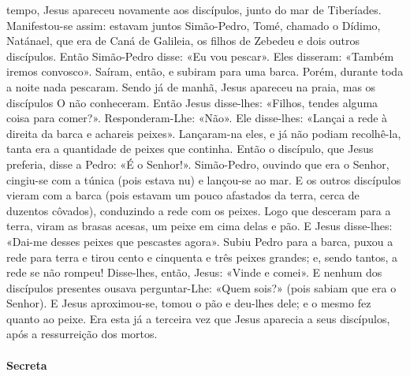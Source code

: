 \begin{paracol}{2}
{ tempo, Jesus apareceu novamente aos discípulos, junto do mar de Tiberíades. Manifestou-se assim: estavam juntos Simão-Pedro, Tomé, chamado o Dídimo, Natánael, que era de Caná de Galileia, os filhos de Zebedeu e dois outros discípulos. Então Simão-Pedro disse: «Eu vou pescar». Eles disseram: «Também iremos convosco». Saíram, então, e subiram para uma barca. Porém, durante toda a noite nada pescaram. Sendo já de manhã, Jesus apareceu na praia, mas os discípulos O não conheceram. Então Jesus disse-lhes: «Filhos, tendes alguma coisa para comer?». Responderam-Lhe: «Não». Ele disse-lhes: «Lançai a rede à direita da barca e achareis peixes». Lançaram-na eles, e já não podiam recolhê-la, tanta era a quantidade de peixes que continha. Então o discípulo, que Jesus preferia, disse a Pedro: «É o Senhor!». Simão-Pedro, ouvindo que era o Senhor, cingiu-se com a túnica (pois estava nu) e lançou-se ao mar. E os outros discípulos vieram com a barca (pois estavam um pouco afastados da terra, cerca de duzentos côvados), conduzindo a rede com os peixes. Logo que desceram para a terra, viram as brasas acesas, um peixe em cima delas e pão. E Jesus disse-lhes: «Dai-me desses peixes que pescastes agora». Subiu Pedro para a barca, puxou a rede para terra e tirou cento e cinquenta e três peixes grandes; e, sendo tantos, a rede se não rompeu! Disse-lhes, então, Jesus: «Vinde e comei». E nenhum dos discípulos presentes ousava perguntar-Lhe: «Quem sois?» (pois sabiam que era o Senhor). E Jesus aproximou-se, tomou o pão e deu-lhes dele; e o mesmo fez quanto ao peixe. Era esta já a terceira vez que Jesus aparecia a seus discípulos, após a ressurreição dos mortos.
}\end{paracol}

\begin{paracol}{2}\switchcolumn{}\end{paracol}

\paragraph{Secreta}
\begin{paracol}{2}\switchcolumn{}\end{paracol}

